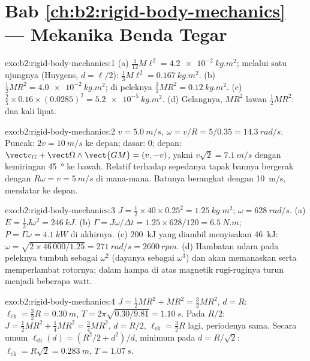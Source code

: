 \section*{Bab \ref{ch:b2:rigid-body-mechanics} --- Mekanika Benda Tegar}

\begin{solution}{exo:b2:rigid-body-mechanics:1}
(a) $\tfrac1{12}M\ell^2 = \qty{4.2e-2}{kg.m^2}$; melalui satu ujungnya
(Huygens, $d = \ell/2$): $\tfrac13M\ell^2 = \qty{0.167}{kg.m^2}$.
(b) $\tfrac12MR^2 =
\qty{4.0e-2}{kg.m^2}$; di peleknya $\tfrac32MR^2 = \qty{0.12}{kg.m^2}$.
(c) $\tfrac25 \times 0.16 \times (0.0285)^2 = \qty{5.2e-5}{kg.m^2}$.
(d) Gelangnya, $MR^2$ lawan $\tfrac12MR^2$: dua kali lipat.
\end{solution}

\begin{solution}{exo:b2:rigid-body-mechanics:2}
$v = \qty{5.0}{m/s}$, $\omega = v/R = 5/0.35 = \qty{14.3}{rad/s}$. Puncak:
$2v = \qty{10}{m/s}$ ke depan; dasar: $0$; depan: $\vect v_G + \vect\Omega
\wedge\vect{GM} = (v, -v)$, yakni $v\sqrt2 = \qty{7.1}{m/s}$ dengan
kemiringan \qty{45}{\degree} ke bawah. Relatif terhadap sepedanya tapak
bannya bergerak dengan $R\omega = v = \qty{5}{m/s}$ di mana-mana. Batunya
berangkat dengan \qty{10}{m/s}, mendatar ke depan.
\end{solution}

\begin{solution}{exo:b2:rigid-body-mechanics:3}
$J = \tfrac12 \times 40 \times 0.25^2 = \qty{1.25}{kg.m^2}$; $\omega = \qty{628}{rad/s}$.
(a) $E = \tfrac12J\omega^2 = \qty{246}{kJ}$. (b) $\Gamma = J\omega/\Delta t =
1.25 \times 628/120 = \qty{6.5}{N.m}$; $P = \Gamma\omega = \qty{4.1}{kW}$ di akhirnya.
(c) \qty{200}{kJ} yang diambil menyisakan \qty{46}{kJ}: $\omega = \sqrt{2 \times 46\,000/1.25}
= \qty{271}{rad/s} = \qty{2600}{rpm}$. (d) Hambatan udara pada peleknya
tumbuh sebagai $\omega^2$ (dayanya sebagai $\omega^3$) dan akan
memanaskan serta memperlambat rotornya; dalam hampa di atas 
magnetik rugi-ruginya turun menjadi beberapa watt.
\end{solution}

\begin{solution}{exo:b2:rigid-body-mechanics:4}
$J = \tfrac12MR^2 + MR^2 = \tfrac32MR^2$, $d = R$: $\ell_{\text{ek}} = \tfrac32R
= \qty{0.30}{m}$, $T = 2\pi\sqrt{0.30/9.81} = \qty{1.10}{s}$. Pada $R/2$: $J =
\tfrac12MR^2 + \tfrac14MR^2 = \tfrac34MR^2$, $d = R/2$, $\ell_{\text{ek}} =
\tfrac32R$ lagi, periodenya sama. Secara umum $\ell_{\text{ek}}(d) = (R^2/2 +
d^2)/d$, minimum pada $d = R/\sqrt2$: $\ell_{\text{ek}} = R\sqrt2 = \qty{0.283}{m}$,
$T = \qty{1.07}{s}$.
\end{solution}

